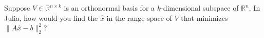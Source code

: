 \documentclass[12pt, leqno]{article}
\begin{document}

Suppose $V \in \mathbb{R}^{n \times k}$ is an orthonormal basis for a $k$-dimensional subspace of $\mathbb{R}^n$.  In Julia, how would you find the $\hat{x}$ in the range space of $V$ that minimizes $\|A\hat{x}-b\|_2^2$?
\end{document}
